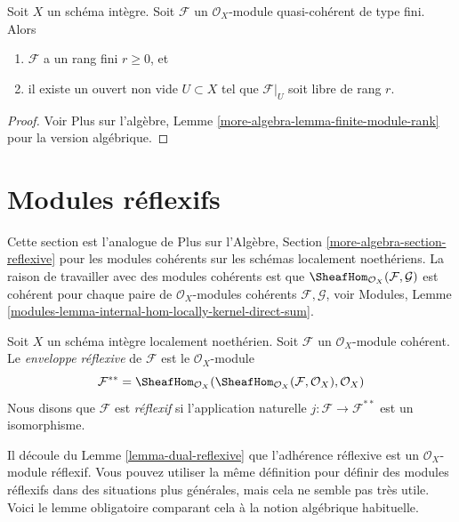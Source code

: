 \begin{lemma}
\label{lemma-finite-module-rank}
Soit  $X$  un schéma intègre. Soit  $\mathcal{F}$  un  $\mathcal{O}_X$-module
quasi-cohérent de type fini. Alors
\begin{enumerate}
\item $\mathcal{F}$  a un rang fini  $r \geq 0$, et
\item il existe un ouvert non vide  $U \subset X$  tel que  $\mathcal{F}|_U$  soit libre de rang
 $r$.
\end{enumerate}
\end{lemma}

\begin{proof}
Voir Plus sur l’algèbre, Lemme  \ref{more-algebra-lemma-finite-module-rank}  pour la version algébrique.
\end{proof}











\section{Modules réflexifs}
\label{section-reflexive}

\noindent
Cette section est l'analogue de Plus sur l'Algèbre, Section  \ref{more-algebra-section-reflexive}  pour les
modules cohérents sur les schémas localement noethériens. La raison de travailler
avec des modules cohérents est que  $\SheafHom_{\mathcal{O}_X}(\mathcal{F}, \mathcal{G})$  est cohérent pour chaque paire de
 $\mathcal{O}_X$-modules cohérents  $\mathcal{F}, \mathcal{G}$, voir Modules, Lemme  \ref{modules-lemma-internal-hom-locally-kernel-direct-sum}.

\begin{definition}
\label{definition-reflexive}
Soit  $X$  un schéma intègre localement noethérien. Soit  $\mathcal{F}$  un
 $\mathcal{O}_X$-module cohérent. Le  {\it  enveloppe
réflexive}  de  $\mathcal{F}$  est le  $\mathcal{O}_X$-module
$$
\mathcal{F}^{**} = \SheafHom_{\mathcal{O}_X}(
\SheafHom_{\mathcal{O}_X}(\mathcal{F}, \mathcal{O}_X), \mathcal{O}_X)
$$
Nous disons que  $\mathcal{F}$  est  {\it  réflexif}  si
l'application naturelle  $j : \mathcal{F} \longrightarrow \mathcal{F}^{**}$  est un isomorphisme.
\end{definition}

\noindent
Il découle du Lemme  \ref{lemma-dual-reflexive}  que l'adhérence réflexive est un
 $\mathcal{O}_X$-module réflexif. Vous pouvez utiliser la même définition pour définir
des modules réflexifs dans des situations plus générales, mais cela ne semble pas
très utile. Voici le lemme obligatoire comparant cela à la notion algébrique
habituelle.

